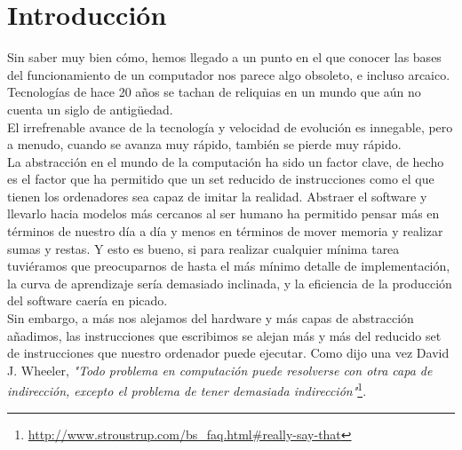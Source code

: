 
\chapter{Introducción}

Sin saber muy bien cómo, hemos llegado a un punto en el que conocer las bases del funcionamiento de un computador nos parece algo obsoleto, e incluso arcaico. Tecnologías de hace 20 años se tachan de reliquias en un mundo que aún no cuenta un siglo de antigüedad.\\

El irrefrenable avance de la tecnología y velocidad de evolución es innegable, pero a menudo, cuando se avanza muy rápido, también se pierde muy rápido.\\

La abstracción en el mundo de la computación ha sido un factor clave, de hecho es el factor que ha permitido que un set reducido de instrucciones como el que tienen los ordenadores sea capaz de imitar la realidad. Abstraer el software y llevarlo hacia modelos más cercanos al ser humano ha permitido pensar más en términos de nuestro día a día y menos en términos de mover memoria y realizar sumas y restas. Y esto es bueno, si para realizar cualquier mínima tarea tuviéramos que preocuparnos de hasta el más mínimo detalle de implementación, la curva de aprendizaje sería demasiado inclinada, y la eficiencia de la producción del software caería en picado.\\

Sin embargo, a más nos alejamos del hardware y más capas de abstracción añadimos, las instrucciones que escribimos se alejan más y más del reducido set de instrucciones que nuestro ordenador puede ejecutar. Como dijo una vez David J. Wheeler, \emph{"Todo problema en computación puede resolverse con otra capa de indirección, excepto el problema de tener demasiada indirección"}\footnote{\url{http://www.stroustrup.com/bs_faq.html\#really-say-that}}.\\

